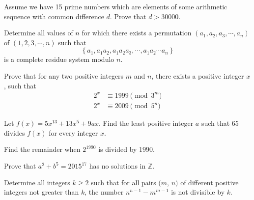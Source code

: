 \begin{problem} %
	Assume we have 15 prime numbers which are elements of some arithmetic sequence with common difference $d$. Prove that $d>30000$.
\end{problem}

\begin{problem} %
	Determine all values of $n$ for which there exists a permutation $(a_1,a_2,a_3,\cdots,a_n)$ of $(1,2,3,\cdots,n)$ such that $$\left\{ {{a_1},{a_1}{a_2},{a_1}{a_2}{a_3},\cdots,{a_1}{a_2}\cdots{a_n}} \right\}$$ is a complete residue system modulo $n$.
\end{problem}

\begin{problem} %
	Prove that for any two positive integers $m$ and $n$, there exists a positive integer $x$, such that
		\begin{align*}
			2^x
				& \equiv 1999 \pmod{3^m}\\
			2^x
				& \equiv 2009\pmod{5^n}
		\end{align*}
\end{problem}

\begin{problem} %
	Let $f(x) = 5 x^{13} + 13 x^5 + 9ax$. Find the least positive integer $a$ such that $65$ divides $f(x)$ for every integer $x$.
\end{problem}

\begin{problem} %
	Find the remainder when $2^{1990}$ is divided by $1990$.
\end{problem}

\begin{problem} %
	Prove that $a^{2}+b^{5}=2015^{17}$ has no solutions in $\mathbb{Z}$.
\end{problem}

\begin{problem} %
	Determine all integers $ k\ge 2$ such that for all pairs $ (m$, $ n)$ of different positive integers not greater than $ k$, the number $ n^{n-1}-m^{m-1}$ is not divisible by $ k$.
\end{problem}

